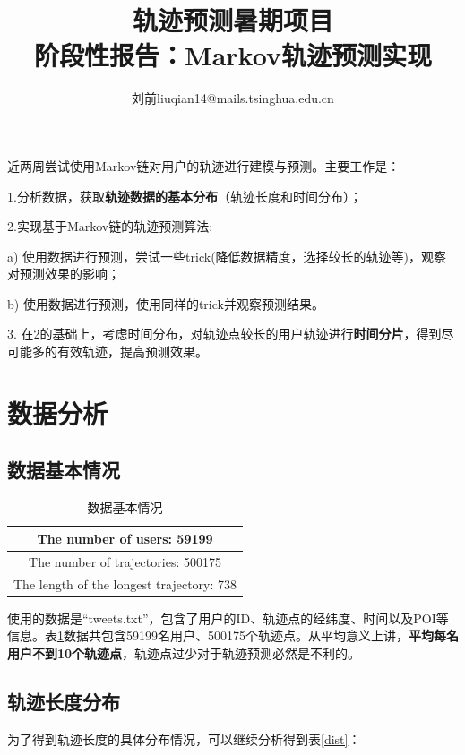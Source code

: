 \documentclass[11pt,twocolumn]{article}
\begin{document}
\title{\textbf{轨迹预测暑期项目} \\ \small{\kaishu 阶段性报告：Markov轨迹预测实现}}
\author{刘前\hspace{2em}liuqian14@mails.tsinghua.edu.cn}
\maketitle

近两周尝试使用Markov链对用户的轨迹进行建模与预测。主要工作是：

1.分析数据，获取\textbf{轨迹数据的基本分布}（轨迹长度和时间分布）；

2.实现基于Markov链的轨迹预测算法:

a)	使用数据进行预测，尝试一些trick(降低数据精度，选择较长的轨迹等)，观察对预测效果的影响；

b)	使用数据进行预测，使用同样的trick并观察预测结果。

3.	在2的基础上，考虑时间分布，对轨迹点较长的用户轨迹进行\textbf{时间分片}，得到尽可能多的有效轨迹，提高预测效果。

\section{数据分析}
\subsection{数据基本情况}

\begin{table}[!htbp]
  \centering  
  \begin{tabular}{|c|} 
  \hline
	The number of users: 59199\\ \hline
	The number of trajectories:  500175\\ \hline
	The length of the longest trajectory:  738\\
  \hline
  \end{tabular}
\caption{数据基本情况}
\label{count}
\end{table}

使用的数据是“tweets.txt”，包含了用户的ID、轨迹点的经纬度、时间以及POI等信息。表\ref{count}数据共包含59199名用户、500175个轨迹点。从平均意义上讲，\textbf{平均每名用户不到10个轨迹点}，轨迹点过少对于轨迹预测必然是不利的。

\subsection{轨迹长度分布}
为了得到轨迹长度的具体分布情况，可以继续分析得到表\ref{dist}：
\end{document}
